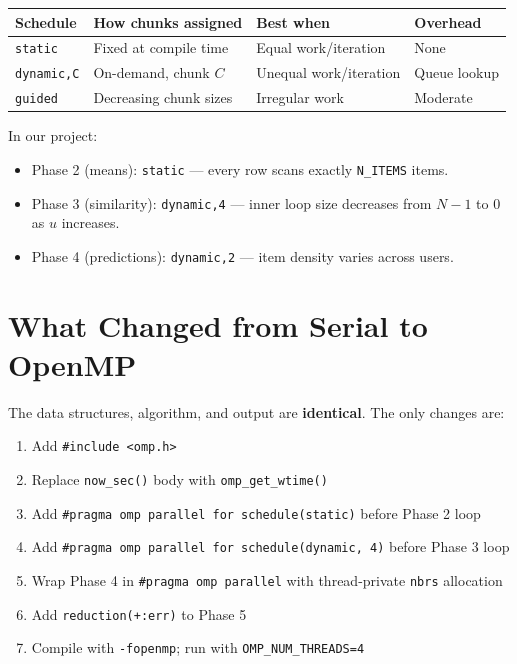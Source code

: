 \documentclass[12pt,a4paper]{article}
\begin{document}
\begin{center}
\begin{tabular}{llll}
\toprule
Schedule & How chunks assigned & Best when & Overhead \\
\midrule
\texttt{static} & Fixed at compile time & Equal work/iteration & None \\
\texttt{dynamic,C} & On-demand, chunk $C$ & Unequal work/iteration & Queue lookup \\
\texttt{guided} & Decreasing chunk sizes & Irregular work & Moderate \\
\bottomrule
\end{tabular}
\end{center}

In our project:
\begin{itemize}
    \item Phase 2 (means): \texttt{static} — every row scans exactly
          \texttt{N\_ITEMS} items.
    \item Phase 3 (similarity): \texttt{dynamic,4} — inner loop size
          decreases from $N-1$ to $0$ as $u$ increases.
    \item Phase 4 (predictions): \texttt{dynamic,2} — item density varies
          across users.
\end{itemize}

\section{What Changed from Serial to OpenMP}

The data structures, algorithm, and output are \textbf{identical}.  The only
changes are:

\begin{enumerate}
    \item Add \texttt{\#include <omp.h>}
    \item Replace \texttt{now\_sec()} body with \texttt{omp\_get\_wtime()}
    \item Add \texttt{\#pragma omp parallel for schedule(static)} before
          Phase 2 loop
    \item Add \texttt{\#pragma omp parallel for schedule(dynamic, 4)} before
          Phase 3 loop
    \item Wrap Phase 4 in \texttt{\#pragma omp parallel} with thread-private
          \texttt{nbrs} allocation
    \item Add \texttt{reduction(+:err)} to Phase 5
    \item Compile with \texttt{-fopenmp}; run with
          \texttt{OMP\_NUM\_THREADS=4}
\end{enumerate}
\end{document}
